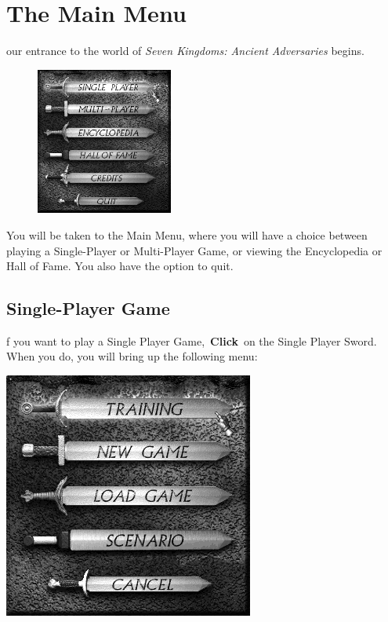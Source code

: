 \clearpage

\section{The Main Menu}

our entrance to the world of \textit{Seven Kingdoms: Ancient Adversaries} begins.

\begin{figure}
	\begin{center}
		\vspace{-20pt}
		\includegraphics[width=0.4\textwidth]{SWmainmenu}
	\end{center}
	\vspace{-20pt}
\end{figure}

You will be taken to the Main Menu, where you will have a choice between playing a Single-Player or Multi-Player Game, or viewing the Encyclopedia or Hall of Fame. You also have the option to quit.

\subsection{Single-Player Game}


f you want to play a Single Player Game, \textbf{Click} on the Single Player Sword. When you do, you will bring up the following menu: 

\begin{center}
\includegraphics[width=0.5\linewidth]{SWsingleplayer}
\end{center}

